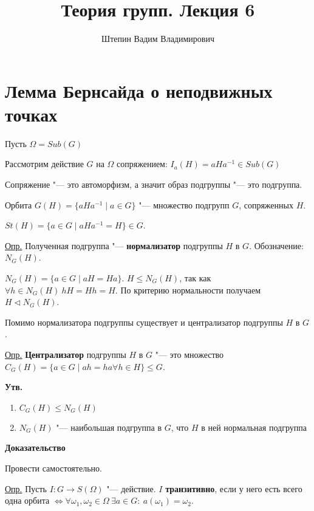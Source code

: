\documentclass{article}
\title{Теория групп. Лекция 6}
\author{Штепин Вадим Владимирович}
\date{\DTMdate{2019-10-10}}
\begin{document}
\maketitle

\section{Лемма Бернсайда о неподвижных точках}

Пусть $\Omega = Sub(G)$

Рассмотрим действие $G$ на $\Omega$ сопряжением: $I_a(H) = aHa^{-1} \in Sub(G)$

Сопряжение "--- это автоморфизм, а значит образ подгруппы "--- это подгруппа.

Орбита $G(H) = \{aHa^{-1} \mid a \in G\}$ "--- множество подгрупп $G$, сопряженных $H$.

$St(H) = \{a \in G \mid aHa^{-1}=H\} \in G$.

\vspace{5pt}

\underline{Опр.} Полученная подгруппа "--- \textbf{нормализатор} подгруппы $H$ в $G$. Обозначение: $N_G(H)$.

$N_G(H) = \{a \in G \mid aH = Ha\}$. $H \leq N_G(H)$, так как $\forall h \in N_G(H) \  hH = Hh = H$. По критерию нормальности получаем $H \triangleleft N_G(H)$.

Помимо нормализатора подгруппы существует и централизатор подгруппы $H$ в $G$.

\vspace{5pt}

\underline{Опр.} \textbf{Централизатор} подгруппы $H$ в $G$ "--- это множество $C_G(H) = \{a \in G \mid ah = ha \forall h \in H\} \leq G$.

\vspace{10pt}

\textbf{Утв.}
\begin{enumerate}
	\item $C_G(H) \leq N_G(H)$
	\item $N_G(H)$ "--- наибольшая подгруппа в $G$, что $H$ в ней нормальная подгруппа
\end{enumerate}

\textbf{Доказательство}

Провести самостоятельно.

\vspace{10pt}

\underline{Опр.} Пусть $I : G \rightarrow S(\Omega)$ "--- действие. $I$ \textbf{транзитивно}, если у него есть всего одна орбита $\Leftrightarrow \forall \omega_1, \omega_2 \in \Omega \  \exists a \in G: \  a(\omega_1) = \omega_2$.
\end{document}
